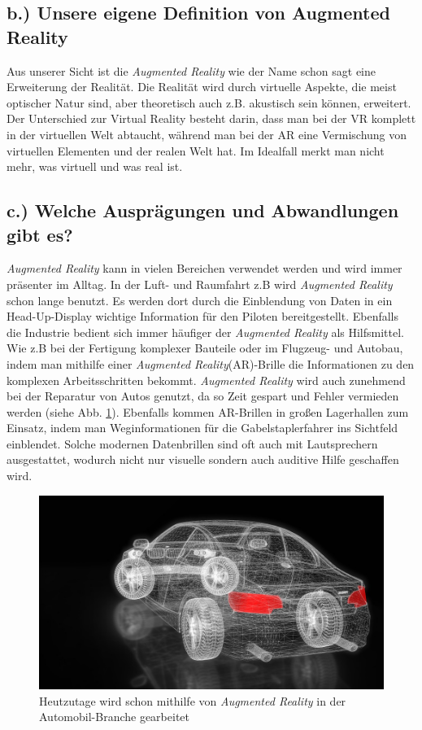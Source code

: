 \documentclass[12pt,utf8]{scrartcl}
\begin{document}
\begin{flushleft}
\subsection*{\label{sub2:thema}b.) Unsere eigene Definition von Augmented Reality}

Aus unserer Sicht ist die \textit{Augmented Reality} wie der Name schon sagt eine Erweiterung der Realität. Die Realität wird durch virtuelle Aspekte, die meist optischer Natur sind, aber theoretisch auch z.B. akustisch sein können, erweitert. Der Unterschied zur Virtual Reality besteht darin, dass man bei der VR komplett in der virtuellen Welt abtaucht, während man bei der AR eine Vermischung von virtuellen Elementen und der realen Welt hat. Im Idealfall merkt man nicht mehr, was virtuell und was real ist. 

\subsection*{\label{sub3:thema}c.) Welche Ausprägungen und Abwandlungen gibt es?}

\textit{Augmented Reality} kann in vielen Bereichen verwendet werden und wird immer präsenter im Alltag. In der Luft- und Raumfahrt z.B wird \textit{Augmented Reality} schon lange benutzt. Es werden dort durch die Einblendung von Daten in ein Head-Up-Display wichtige Information für den Piloten bereitgestellt. Ebenfalls die Industrie bedient sich immer häufiger der \textit{Augmented Reality} als Hilfsmittel. Wie z.B bei der Fertigung komplexer Bauteile oder im Flugzeug- und Autobau, indem man mithilfe einer \textit{Augmented Reality}(AR)-Brille die Informationen zu den komplexen Arbeitsschritten bekommt. \textit{Augmented Reality} wird auch zunehmend bei der Reparatur von Autos genutzt, da so Zeit gespart und Fehler vermieden werden (siehe Abb. \ref{fig:autoholo}). Ebenfalls kommen AR-Brillen in großen Lagerhallen zum Einsatz, indem man Weginformationen für die Gabelstaplerfahrer ins Sichtfeld einblendet. Solche modernen Datenbrillen sind oft auch mit Lautsprechern ausgestattet, wodurch nicht nur visuelle sondern auch auditive Hilfe geschaffen wird.

\begin{figure}[H]
	\centering
	\includegraphics[width=0.8\linewidth]{images/autoholo}
	\caption{Heutzutage wird schon mithilfe von \textit{Augmented Reality} in der Automobil-Branche gearbeitet\cite{online5}}
	\label{fig:autoholo}
\end{figure}


\end{flushleft}
\end{document}
